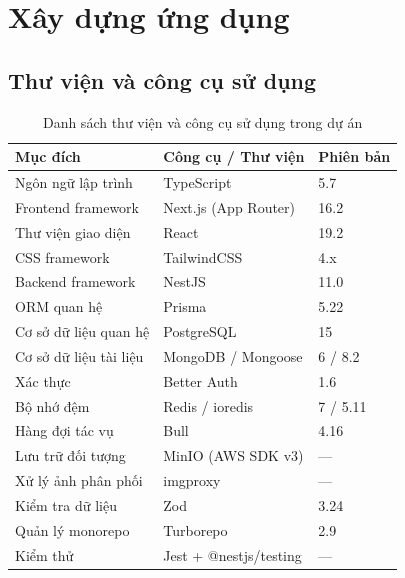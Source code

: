 \documentclass[../main.tex]{subfiles}
\providecommand{\DIFaddend}{} %
\providecommand{\DIFdelbegin}{} %
\providecommand{\DIFaddbeginFL}{} %
\providecommand{\DIFaddendFL}{} %
\providecommand{\DIFdelendFL}{} %
\begin{document}
\DIFaddend %
\section{Xây dựng ứng dụng}
\label{section:4.3}

\subsection{Thư viện và công cụ sử dụng}
\label{subsection:4.3.1}

\DIFdelbegin %
\DIFdelendFL \DIFaddbeginFL \begin{table}[htbp]
\DIFaddendFL \centering{}
    \begin{tabulary}{\textwidth}{LLL}
        \hline
        \textbf{Mục đích} & \textbf{Công cụ / Thư viện} & \textbf{Phiên bản} \\ \hline
        Ngôn ngữ lập trình & TypeScript & 5.7 \\ \hline
        Frontend framework & Next.js (App Router) & 16.2 \\ \hline
        Thư viện giao diện & React & 19.2 \\ \hline
        CSS framework & TailwindCSS & 4.x \\ \hline
        Backend framework & NestJS & 11.0 \\ \hline
        ORM quan hệ & Prisma & 5.22 \\ \hline
        Cơ sở dữ liệu quan hệ & PostgreSQL & 15 \\ \hline
        Cơ sở dữ liệu tài liệu & MongoDB / Mongoose & 6 / 8.2 \\ \hline
        Xác thực & Better Auth & 1.6 \\ \hline
        Bộ nhớ đệm & Redis / ioredis & 7 / 5.11 \\ \hline
        Hàng đợi tác vụ & Bull & 4.16 \\ \hline
        Lưu trữ đối tượng & MinIO (AWS SDK v3) & --- \\ \hline
        Xử lý ảnh phân phối & imgproxy & --- \\ \hline
        Kiểm tra dữ liệu & Zod & 3.24 \\ \hline
        Quản lý monorepo & Turborepo & 2.9 \\ \hline
        Kiểm thử & Jest + @nestjs/testing & --- \\ \hline
    \end{tabulary}
    \caption{Danh sách thư viện và công cụ sử dụng trong dự án}
    \label{table:tools}
\end{table}
\end{document}

